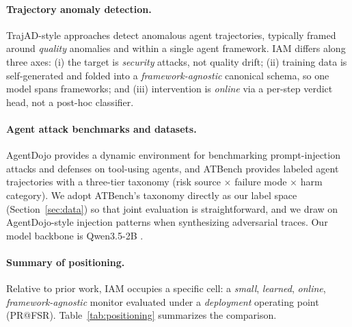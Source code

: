 \paragraph{Trajectory anomaly detection.}
TrajAD-style \citep{trajad} approaches detect anomalous agent trajectories,
typically framed around \emph{quality} anomalies and within a single agent
framework. IAM differs along three axes: (i) the target is
\emph{security} attacks, not quality drift; (ii) training data is
self-generated and folded into a \emph{framework-agnostic} canonical schema, so
one model spans frameworks; and (iii) intervention is \emph{online} via a
per-step verdict head, not a post-hoc classifier.

\paragraph{Agent attack benchmarks and datasets.}
AgentDojo \citep{agentdojo} provides a dynamic environment for benchmarking
prompt-injection attacks and defenses on tool-using agents, and ATBench
\citep{atbench} provides labeled agent trajectories with a three-tier taxonomy
(risk source $\times$ failure mode $\times$ harm category). We adopt ATBench's
taxonomy directly as our label space (Section~\ref{sec:data}) so that joint
evaluation is straightforward, and we draw on AgentDojo-style injection
patterns when synthesizing adversarial traces. Our model backbone is Qwen3.5-2B
\citep{qwen3}.

\paragraph{Summary of positioning.}
Relative to prior work, IAM occupies a specific cell: a \emph{small},
\emph{learned}, \emph{online}, \emph{framework-agnostic} monitor evaluated under
a \emph{deployment} operating point (PR@FSR). Table~\ref{tab:positioning}
summarizes the comparison. %

